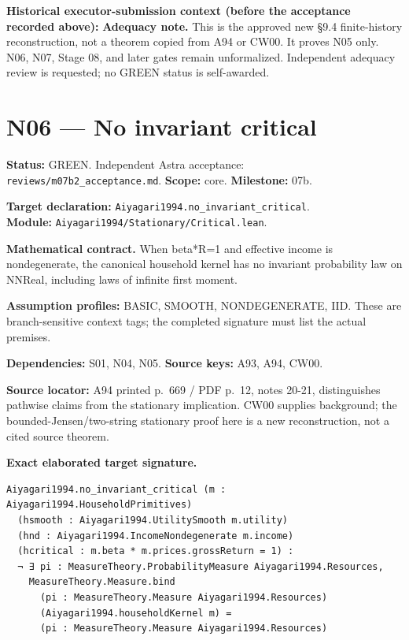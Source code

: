 \documentclass[
  11pt,
]{article}
\let\LedgerOriginalTexttt\texttt
\renewcommand{\texttt}[1]{{\small\LedgerOriginalTexttt{#1}}}
\begin{document}
\textbf{Historical executor-submission context (before the acceptance
recorded above):} \textbf{Adequacy note.} This is the approved new §9.4
finite-history reconstruction, not a theorem copied from A94 or CW00. It
proves N05 only. N06, N07, Stage 08, and later gates remain
unformalized. Independent adequacy review is requested; no GREEN status
is self-awarded.

\section{N06 --- No invariant critical}\label{n06-no-invariant-critical}

\textbf{Status:} GREEN. Independent Astra acceptance:
\texttt{reviews/m07b2\_acceptance.md}. \textbf{Scope:} core.
\textbf{Milestone:} 07b.

\textbf{Target declaration:}
\texttt{Aiyagari1994.no\_invariant\_critical}.\\
\textbf{Module:} \texttt{Aiyagari1994/Stationary/Critical.lean}.

\textbf{Mathematical contract.} When beta*R=1 and effective income is
nondegenerate, the canonical household kernel has no invariant
probability law on NNReal, including laws of infinite first moment.

\textbf{Assumption profiles:} BASIC, SMOOTH, NONDEGENERATE, IID. These
are branch-sensitive context tags; the completed signature must list the
actual premises.

\textbf{Dependencies:} S01, N04, N05. \textbf{Source keys:} A93, A94,
CW00.

\textbf{Source locator:} A94 printed p.~669 / PDF p.~12, notes 20-21,
distinguishes pathwise claims from the stationary implication. CW00
supplies background; the bounded-Jensen/two-string stationary proof here
is a new reconstruction, not a cited source theorem.

\textbf{Exact elaborated target signature.}

\begin{verbatim}
Aiyagari1994.no_invariant_critical (m : Aiyagari1994.HouseholdPrimitives)
  (hsmooth : Aiyagari1994.UtilitySmooth m.utility)
  (hnd : Aiyagari1994.IncomeNondegenerate m.income)
  (hcritical : m.beta * m.prices.grossReturn = 1) :
  ¬ ∃ pi : MeasureTheory.ProbabilityMeasure Aiyagari1994.Resources,
    MeasureTheory.Measure.bind
      (pi : MeasureTheory.Measure Aiyagari1994.Resources)
      (Aiyagari1994.householdKernel m) =
      (pi : MeasureTheory.Measure Aiyagari1994.Resources)
\end{verbatim}
\end{document}
